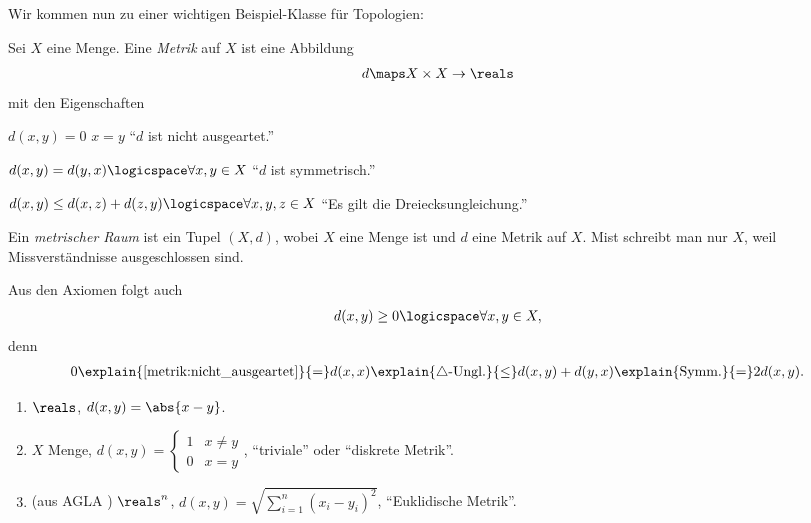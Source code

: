 Wir kommen nun zu einer wichtigen Beispiel-Klasse für Topologien:
\begin{definition}
    Sei \( X \) eine Menge. Eine \emph{Metrik} auf \( X \) ist eine Abbildung
    \begin{align*}
        d\maps X\times X \to \reals
    \end{align*}
    mit den Eigenschaften
    \begin{eigenschaftenenumerate}
        \item \label{metrik:nicht_ausgeartet}\( d(x,y)=0 \) \tiff \( x=y \) \enquote{\( d \) ist nicht ausgeartet.}
        \item \label{metrik:symmetrisch}\( d(x,y)=d(y,x)\logicspace\forall x,y \in X \) \enquote{\( d \) ist symmetrisch.}
        \item \label{metrik:dreiecksungleichung} \( d(x,y)\leq d(x,z)+d(z,y) \logicspace\forall x,y,z\in X\) \enquote{Es gilt die Dreiecksungleichung.} 
    \end{eigenschaftenenumerate}
    Ein \emph{metrischer Raum} ist ein Tupel \( (X,d) \), wobei \( X \) eine Menge ist und \( d \) eine Metrik auf \( X \). Mist schreibt man nur \( X \), weil Missverständnisse ausgeschlossen sind.
\end{definition}
\begin{bemerkung*}
    Aus den Axiomen folgt auch
    \begin{align*}
        d(x,y)\geq 0 \logicspace \forall x,y \in X,
    \end{align*}
    denn
    \begin{align*}
        0\explain{\ref{metrik:nicht_ausgeartet}}{=}d(x,x)\explain{\triangle\text{-Ungl.}}{\leq}d(x,y)+d(y,x)\explain{\text{Symm.}}{=}2d(x,y).
    \end{align*}
\end{bemerkung*}
\begin{beispiele*}
    \begin{enumerate}[label=\rechtsklammer{\roman*}, ref=\rechtsklammer{\roman*}]
        \item \label{metrik:beispiele:r}\( \reals \), \( d(x,y)=\abs{x-y} \).
        \item \label{metrik:beispiele:diskret}\( X \) Menge, \( d(x,y)=\begin{cases}
            1 & x\neq y\\
            0 & x=y
        \end{cases}
         \), \enquote{triviale} oder \enquote{diskrete Metrik}.
         
         \item\label{metrik:beispiele:r_n} (aus AGLA ) \( \reals^n \), \( d(x,y)=\sqrt{\sum_{i=1}^{n} (x_i-y_i)^2} \), \enquote{Euklidische Metrik}.
    \end{enumerate}
\end{beispiele*}
